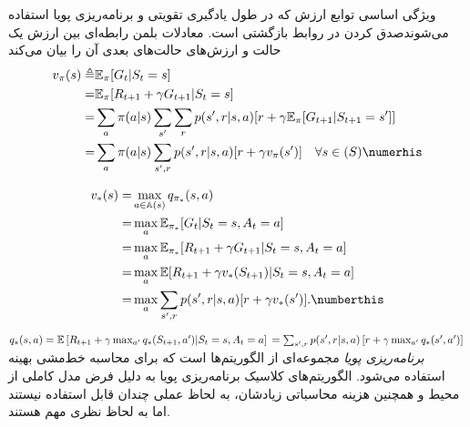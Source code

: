 
ویژگی اساسی توابع ارزش که در طول یادگیری تقویتی و برنامه‌ریزی پویا استفاده می‌شوندصدق کردن در روابط بازگشتی است. معادلات بلمن رابطه‌ای بین ارزش یک حالت و ارزش‌های حالت‌های بعدی آن را بیان می‌کند
\begin{align}
v_\pi (s) \triangleq& \mathbb{E}_\pi [G_t | S_t = s] \nonumber \\
=& \mathbb{E}_\pi [R_{t+1}+ \gamma G_{t+1}|S_t=s] \nonumber \\
=&\sum_{a} \pi(a|s) \sum_{s'}\sum_{r} p(s',r|s,a)[r+\gamma \mathbb{E}_\pi[G_{t+1}|S_{t+1}=s']] \nonumber\\
=&\sum_{a} \pi(a|s) \sum_{s',r} p(s',r|s,a)[r+\gamma v_\pi(s')] \quad \forall s \in \mathbb(S) \numerhis 
\label{bellman}
\end{align}

\begin{align}
  v_{*}(s)= &\max_{a \in \mathbb{A}(s)} q_{\pi_*}(s,a) \nonumber \\
      =& \max_{a} \mathbb{E}_{\pi_*} [G_t|S_t=s, A_t=a] \nonumber \\ 
      =& \max_{a} \mathbb{E}_{\pi_*} [R_{t+1} + \gamma G_{t+1} | S_t=s, A_t=a] \nonumber \\ 
      =& \max_{a} \mathbb{E} [R_{t+1} + \gamma v_*(S_{t+1}) | S_t= s, A_t = a] \nonumber \\
      =& \max_{a} \sum_{s',r} p(s',r|s,a) [r + \gamma v_*(s')]. \numberthis
\label{eq:bellman-opti}
\end{align}




$q_*(s,a) = \mathbb{E}\left[R_{t+1} + \gamma \max_{a'} q_*(S_{t+1},a')| S_t=s, A_t=a \right] \\
= \sum_{s',r} p(s',r|s,a) \left[r + \gamma \max_{a'} q_*(s',a')\right] \\
$
\textit{برنامه‌ریزی پویا}   مجموعه‌ای از الگوریتم‌ها است که برای محاسبه خط‌مشی بهینه استفاده می‌شود.
الگوریتم‌های کلاسیک برنامه‌ریزی پویا به دلیل فرض
مدل کاملی از محیط و همچنین هزینه محاسباتی زیادشان، به لحاظ عملی چندان قابل استفاده نیستند اما به لحاظ نظری مهم هستند.


